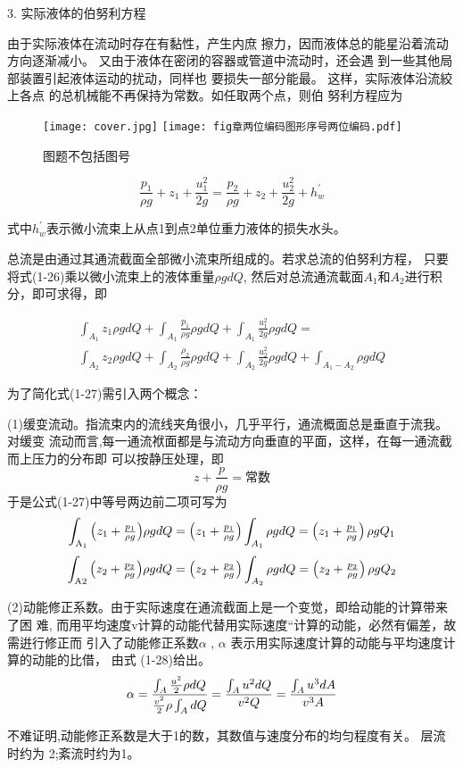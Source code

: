 3.	实际液体的伯努利方程

由于实际液体在流动时存在有黏性，产生内庶 擦力，因而液体总的能星沿着流动方向逐渐减小。 
又由于液体在密闭的容器或管道中流动时，还会遇 到一些其他局部装置引起液体运动的扰动，同样也 要损失一部分能最。
这样，实际液体沿流絞上各点 的总机械能不再保持为常数。如任取两个点，则伯 努利方程应为


\begin{figure}
  \centering
  \ifOpenSource
  \texttt{[image: cover.jpg]}
  \else
  \texttt{[image: fig章两位编码图形序号两位编码.pdf]}%
  \fi
  \caption{图题不包括图号}
  \label{fig:图形文件名不包括扩展名}%
  \end{figure}


$$\frac{p_1}{\rho g}+z_1+\frac{u^2 _1}{2g}=\frac{p_2}{\rho g}+z_2+\frac{u^2_2}{2g}+h^{'} _w$$

式中$h^{'} _w$表示微小流束上从点1到点2单位重力液体的损失水头。

总流是由通过其通流截面全部微小流束所组成的。若求总流的伯努利方程，
只要将式(1-26)乘以微小流束上的液体重量$\rho gdQ$,
然后对总流通流載面$A_1$和$A_2$进行积分，即可求得，即

  
 \begin{equation}
  \begin{aligned}
 \int_{A_1}^{}z_{1}\rho gdQ+\int_{A_1}^{}\frac{p_1}{\rho g}\rho gdQ+  \int_{A_1}^{}\frac{u^2 _1}{2g}\rho gdQ
  = \\ \int_{A_2}^{}z_{2}\rho gdQ
  + \int_{A_2}^{}\frac{\rho _2}{\rho g}\rho gdQ
  +  \int_{A_2}^{}\frac{u^2 _2}{2g}\rho gdQ
  +\int_{A_1-A_2}^{}\rho gdQ 
  \end{aligned}
 \end{equation}
 

为了简化式(1-27)需引入两个概念：

(1)缓变流动。指流束内的流线夹角很小，几乎平行，通流概面总是垂直于流我。对缓变 流动而言,每一通流袱面都是与流动方向垂直的平面，这样，在每一通流截而上压力的分布即
可以按静压处理，即
$$z+\frac{p}{\rho g}=\text{常数}$$
于是公式(1-27)中等号两边前二项可写为
\[\int_{{{\rm{A}}_1}} {\left( {{z_1} + {\textstyle{{{p_1}} \over {\rho g}}}} \right)} \rho gdQ = \left( {{z_1} + {\textstyle{{{p_1}} \over {\rho g}}}} \right)\int_{{A_1}} {\rho gdQ}  = \left( {{z_1} + {\textstyle{{{p_1}} \over {\rho g}}}} \right)\rho g{Q_1}\]
\[\int_{{\rm{A}}2} {\left( {{z_2} + {\textstyle{{{p_2}} \over {\rho g}}}} \right)} \rho gdQ = \left( {{z_2} + {\textstyle{{{p_2}} \over {\rho g}}}} \right)\int_{{A_2}} {\rho gdQ}  = \left( {{z_2} + {\textstyle{{{p_2}} \over {\rho g}}}} \right)\rho g{Q_2}\]

(2)动能修正系数。由于实际速度在通流截面上是一个变觉，即给动能的计算带来了困 难,
而用平均速度v计算的动能代替用实际速度“计算的动能，必然有偏差，故需逬行修正而 
引入了动能修正系数$\alpha$ , $\alpha$ 表示用实际速度计算的动能与平均速度计算的动能的比借，
由式 (1-28)给出。
\[\alpha  = \frac{{\int_A {{\textstyle{{{u^2}} \over 2}}\rho dQ} }}{{{\textstyle{{{v^2}} \over 2}}\rho \int_A {dQ} }} = \frac{{\int_A {{u^2}dQ} }}{{{v^2}Q}} = \frac{{\int_A {{u^3}dA} }}{{{v^3}A}}\]

不难证明,动能修正系数是大于1的数，其数值与速度分布的均匀程度有关。
层流时约为 2;紊流时约为1。